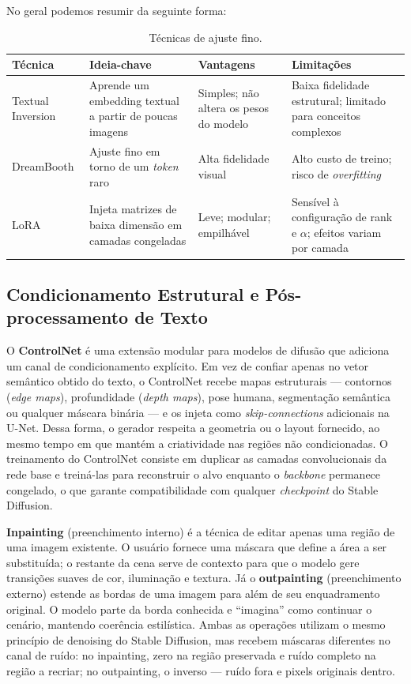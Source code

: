 \documentclass[12pt, %
openright, 
oneside, %
a4paper,    %
brazil]{facom-ufu-abntex2}
\begin{document}
No geral podemos resumir da seguinte forma:
\begin{table}[H]
    \centering
    \small
    \setlength{\tabcolsep}{4pt}
    \begin{tabularx}{\linewidth}{|l|X|X|X|}
    \hline
    \textbf{Técnica} & \textbf{Ideia-chave} & \textbf{Vantagens} & \textbf{Limitações} \\ \hline
    Textual Inversion & Aprende um embedding textual a partir de poucas imagens & Simples; não altera os pesos do modelo & Baixa fidelidade estrutural; limitado para conceitos complexos \\ \hline
    DreamBooth & Ajuste fino em torno de um \textit{token} raro & Alta fidelidade visual & Alto custo de treino; risco de \textit{overfitting} \\ \hline
    LoRA & Injeta matrizes de baixa dimensão em camadas congeladas & Leve; modular; empilhável & Sensível à configuração de rank e \(\alpha\); efeitos variam por camada \\ \hline
    \end{tabularx}
    \caption{Técnicas de ajuste fino.}
    \label{tab:tecnicas_personalizacao}
\end{table}

\subsection{Condicionamento Estrutural e Pós-processamento de Texto}

O \textbf{ControlNet} é uma extensão modular para modelos de difusão que adiciona um canal de condicionamento explícito. Em vez de confiar apenas no vetor semântico obtido do texto, o ControlNet recebe mapas estruturais — contornos (\emph{edge maps}), profundidade (\emph{depth maps}), pose humana, segmentação semântica ou qualquer máscara binária — e os injeta como \emph{skip-connections} adicionais na U-Net. Dessa forma, o gerador respeita a geometria ou o layout fornecido, ao mesmo tempo em que mantém a criatividade nas regiões não condicionadas. O treinamento do ControlNet consiste em duplicar as camadas convolucionais da rede base e treiná-las para reconstruir o alvo enquanto o \emph{backbone} permanece congelado, o que garante compatibilidade com qualquer \emph{checkpoint} do Stable Diffusion.

\textbf{Inpainting} (preenchimento interno) é a técnica de editar apenas uma região de uma imagem existente. O usuário fornece uma máscara que define a área a ser substituída; o restante da cena serve de contexto para que o modelo gere transições suaves de cor, iluminação e textura. Já o \textbf{outpainting} (preenchimento externo) estende as bordas de uma imagem para além de seu enquadramento original. O modelo parte da borda conhecida e ``imagina'' como continuar o cenário, mantendo coerência estilística. Ambas as operações utilizam o mesmo princípio de denoising do Stable Diffusion, mas recebem máscaras diferentes no canal de ruído: no inpainting, zero na região preservada e ruído completo na região a recriar; no outpainting, o inverso — ruído fora e pixels originais dentro.
\end{document}
